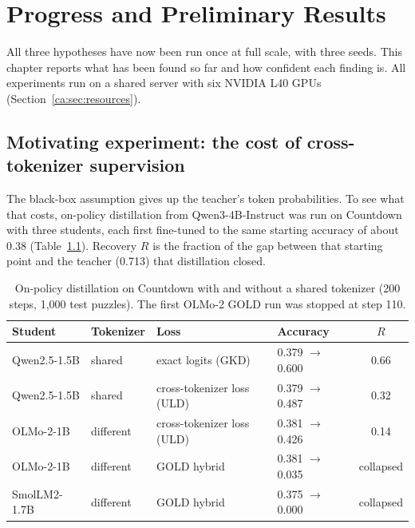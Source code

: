 \chapter{Progress and Preliminary Results}
\label{ca:chap:progress}

All three hypotheses have now been run once at full scale, with three seeds. This chapter
reports what has been found so far and how confident each finding is. All experiments run
on a shared server with six NVIDIA L40 GPUs (Section~\ref{ca:sec:resources}).

\section{Motivating experiment: the cost of cross-tokenizer supervision}
\label{ca:sec:motivating}

The black-box assumption gives up the teacher's token probabilities. To see what that
costs, on-policy distillation from Qwen3-4B-Instruct was run on Countdown with three
students, each first fine-tuned to the same starting accuracy of about 0.38
(Table~\ref{ca:tab:motivating}). Recovery $R$ is the fraction of the gap between that
starting point and the teacher (0.713) that distillation closed.

\begin{table}[htbp]
\centering
\small
\begin{tabular}{@{}llllc@{}}
\toprule
\textbf{Student} & \textbf{Tokenizer} & \textbf{Loss} & \textbf{Accuracy} & $R$ \\
\midrule
Qwen2.5-1.5B & shared       & exact logits (GKD)                & 0.379 $\to$ 0.600 & 0.66 \\
Qwen2.5-1.5B & shared       & cross-tokenizer loss (ULD)        & 0.379 $\to$ 0.487 & 0.32 \\
OLMo-2-1B    & different    & cross-tokenizer loss (ULD)        & 0.381 $\to$ 0.426 & 0.14 \\
OLMo-2-1B    & different    & GOLD hybrid                       & 0.381 $\to$ 0.035 & collapsed \\
SmolLM2-1.7B & different    & GOLD hybrid                       & 0.375 $\to$ 0.000 & collapsed \\
\bottomrule
\end{tabular}
\caption{On-policy distillation on Countdown with and without a shared tokenizer
(200 steps, 1,000 test puzzles). The first OLMo-2 GOLD run was stopped at step 110.}
\label{ca:tab:motivating}
\end{table}

